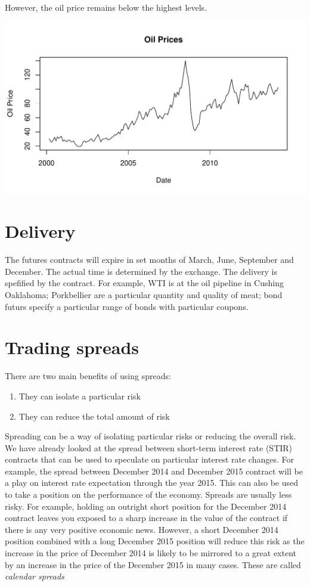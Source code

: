 \documentclass[12pt, a4paper, oneside]{article}\usepackage[]{graphicx}\usepackage[]{color}
\makeatletter
\def\maxwidth{ %
  \ifdim\Gin@nat@width>\linewidth
    \linewidth
  \else
    \Gin@nat@width
  \fi
}
\newenvironment{knitrout}{}{} %
\makeatother
\begin{document}
However, the oil price remains below the highest levels. 

\begin{knitrout}
\color{fgcolor}
\includegraphics[width=\maxwidth]{figure/oilprice} 

\end{knitrout}


\section*{Delivery}
The futures contracts will expire in set months of March, June, September and December.  The actual time is determined by the exchange. The delivery is spefified by the contract.  For example, WTI is at the oil pipeline in Cushing Oaklahoma; Porkbellier are a particular quantity and quality of meat; bond futurs specify a particular range of bonds with particular coupons. 

\section*{Trading spreads}
There are two main benefits of using spreads:  

\begin{enumerate}
\item They can isolate a particular risk
\item They can reduce the total amount of risk
\end{enumerate}

Spreading can be a way of isolating particular risks or reducing the overall risk.  We have already looked at the spread between short-term interest rate (STIR) contracts that can be used to speculate on particular interest rate changes.  For example, the spread between December 2014 and December 2015 contract will be a play on interest rate expectation through the year 2015.  This can also be used to take a position on the performance of the economy.  Spreads are usually less risky.  For example, holding an outright short position for the December 2014 contract leaves you exposed to a sharp increase in the  value of the contract if there is any very positive economic news.  However, a short December 2014 position combined with  a long December 2015 position will reduce this risk as the increase in the price of December 2014 is likely to be mirrored to a great extent by an increase in the price of the December 2015 in many cases.  These are called \emph{calendar spreads}
\end{document}
